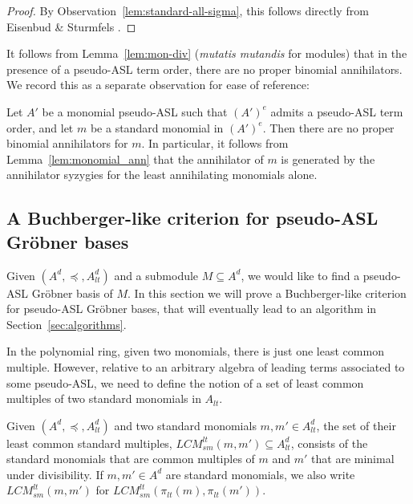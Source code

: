 \documentclass[11pt,reqno]{amsart}
\newcommand{\gb}{Gr\"{o}bner }
\newcommand{\lcmlt}{LCM_{sm}^{lt}}
\newcommand{\piltd}{\pi_{lt}}
\theoremstyle{definition}
\numberwithin{equation}{section}
\begin{document}
\begin{proof}
By Observation~\ref{lem:standard-all-sigma}, this follows directly from Eisenbud \& Sturmfels \cite[Cor.~1.7]{ES}. 
\end{proof}

It follows from Lemma~\ref{lem:mon-div} (\emph{mutatis mutandis} for modules) that in the presence of a pseudo-ASL term order, there are no proper binomial annihilators. We record this as a separate observation for ease of reference: 

\begin{observation} \label{obs:no-binomial-ann}
Let $A'$ be a monomial pseudo-ASL such that $(A')^e$ admits a pseudo-ASL term order, and let $m$ be a standard monomial in $(A')^e$. Then there are no proper binomial annihilators for $m$. In particular, it follows from Lemma~\ref{lem:monomial_ann} that the annihilator of $m$ is generated by the annihilator syzygies for the least annihilating monomials alone.
\end{observation}

\subsection{A Buchberger-like criterion for pseudo-ASL Gröbner bases}
\label{sec:buchberger}
Given $(A^d, \preceq, A_{lt}^d)$ and a submodule $M \subseteq A^d$, we would like to find a pseudo-ASL \gb basis of $M$. In this section we will prove a Buchberger-like criterion for pseudo-ASL \gb bases, that will eventually lead to an algorithm in Section~\ref{sec:algorithms}.


In the polynomial ring, given two monomials, there is just one least common multiple. However, relative to an arbitrary algebra of leading terms associated to some pseudo-ASL, we need to define the notion of a set of least common multiples of two standard monomials in $A_{lt}$.

\begin{definition}
\label{defn:lcms}
Given $(A^d,\preceq, A_{lt}^d)$ and two standard monomials $m,m' \in A_{lt}^d$, the set of their least common standard multiples, $\lcmlt(m, m') \subseteq A_{lt}^d$, consists of the standard monomials that are common multiples of $m$ and $m'$ that are minimal under divisibility. If $m,m' \in A^d$ are standard monomials, we also write $\lcmlt(m,m')$ for $\lcmlt(\piltd(m), \piltd(m'))$.
\end{definition}
\end{document}
